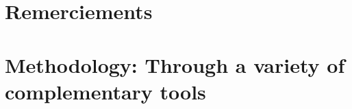 \documentclass[a4paper,twoside,10pt,final]{memoir} %
\begin{document}



\frontmatter


\clearemptydoublepage


\clearemptydoublepage

\chapter*{Remerciements}

\clearemptydoublepage

\thispagestyle{empty}
\tableofcontents*
\clearemptydoublepage

\printunsrtglossaries


\clearemptydoublepage
%


\mainmatter

%

\chapter{Methodology: Through a variety of complementary tools}
\label{chap:chap_methodo}

\clearpage
\end{document}
